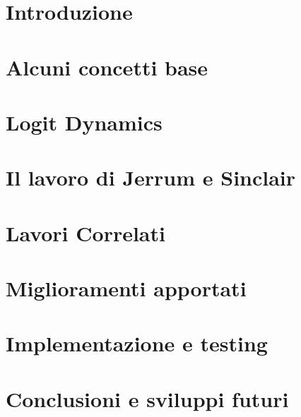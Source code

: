 \documentclass[11pt,oneside]{book}
\begin{document}
\vfill

{\hypersetup{linkcolor=black}
	\tableofcontents
}

\chapter{Introduzione}
\setcounter{page}{1} 		%



\chapter{Alcuni concetti base}


\chapter{Logit Dynamics}


\chapter{Il lavoro di Jerrum e Sinclair}


\chapter{Lavori Correlati}


\chapter{Miglioramenti apportati}


\chapter{Implementazione e testing}


\chapter{Conclusioni e sviluppi futuri}

\end{document}
